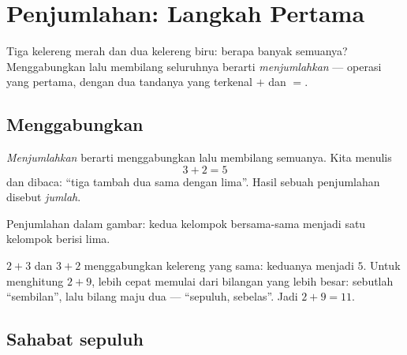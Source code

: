 \chapter{Penjumlahan: Langkah Pertama}\label{ch:g1:addition}

Tiga kelereng merah dan dua kelereng biru: berapa banyak semuanya?
Menggabungkan lalu membilang seluruhnya berarti \emph{menjumlahkan}
--- operasi yang pertama, dengan dua tandanya yang terkenal $+$ dan
$=$.

\section{Menggabungkan}

\begin{definition}[Penjumlahan]\label{def:g1:addition:def}
\emph{Menjumlahkan} berarti menggabungkan lalu membilang semuanya.
Kita menulis
\[
3 + 2 = 5
\]
dan dibaca: ``tiga tambah dua sama dengan lima''. Hasil sebuah
penjumlahan disebut \emph{jumlah}.
\end{definition}

\begin{omfigure}

{\small Penjumlahan dalam gambar: kedua kelompok bersama-sama menjadi
satu kelompok berisi lima.}
\end{omfigure}

\begin{example}\label{ex:g1:addition:order}
$2 + 3$ dan $3 + 2$ menggabungkan kelereng yang sama: keduanya
menjadi $5$. Untuk menghitung $2 + 9$, lebih cepat memulai dari
bilangan yang lebih besar: sebutlah ``sembilan'', lalu bilang maju
dua --- ``sepuluh, sebelas''. Jadi $2 + 9 = 11$.
\end{example}

\section{Sahabat sepuluh}

